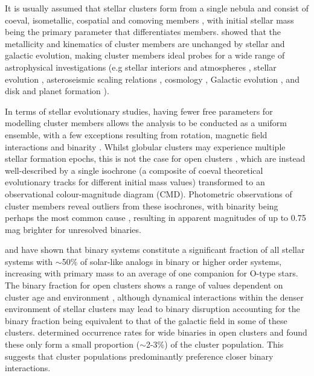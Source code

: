 It is usually assumed that stellar clusters form from a single nebula and consist of coeval, isometallic, cospatial and comoving members \citep{baade_resolution_1944}, with initial stellar mass being the primary parameter that differentiates members. \citet{mould_stellar_1982} showed that the metallicity and kinematics of cluster members are unchanged by stellar and galactic evolution, making cluster members ideal probes for a wide range of astrophysical investigations (e.g stellar interiors and atmospheres \citep{miglio_asteroseismology_2012, corsaro_asteroseismology_2012}, stellar evolution \citep{kalirai_star_2010, jilkova_origin_2012}, asteroseismic scaling relations \citep{stello_amplitudes_2011}, cosmology \citep{krumholz_star_2019}, Galactic evolution \citep{de_grijs_revolution_2010,boesgaard_old_2015}, and disk and planet formation \citep{bonnell_planetary_2001, meibom_same_2013}).

In terms of stellar evolutionary studies, having fewer free parameters for modelling cluster members allows the analysis to be conducted as a uniform ensemble, with a few exceptions resulting from rotation, magnetic field interactions and binarity \citep{carroll_introduction_2006}. Whilst globular clusters may experience multiple stellar formation epochs, this is not the case for open clusters \citep{li_stellar_2016}, which are instead well-described by a single isochrone (a composite of coeval theoretical evolutionary tracks for different initial mass values) transformed to an observational colour-magnitude diagram (CMD). Photometric observations of cluster members reveal outliers from these isochrones, with binarity being perhaps the most common cause \citep[e.g.][]{murphy_finding_2018}, resulting in apparent magnitudes of up to 0.75\,mag brighter for unresolved binaries.

\citet{duquennoy_multiplicity_1991} and \citet{fischer_multiplicity_1992} have shown that binary systems constitute a significant fraction of all stellar systems with $\sim$50\% of solar-like analogs in binary or higher order systems, increasing with primary mass to an average of one companion for O-type stars. The binary fraction for open clusters shows a range of values dependent on cluster age and environment \citep{kroupa_binary_2001, duchene_accretion_1999}, although dynamical interactions within the denser environment of stellar clusters may lead to binary disruption accounting for the binary fraction being equivalent to that of the galactic field in some of these clusters. \citet{deacon_wide_2020} determined occurrence rates for wide binaries in open clusters and found these only form a small proportion ($\sim$2-3\%) of the cluster population. This suggests that cluster populations predominantly preference closer binary interactions. 


